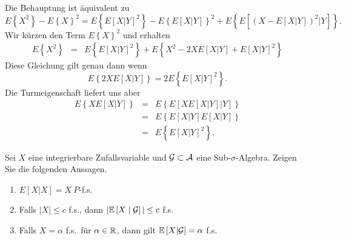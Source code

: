 \solution 
Die Behauptung ist äquivalent zu 
\begin{equation*}
    E\left\{ X^2 \right\} - E\left\{ X \right\}^2 
    = E\left\{ E\left[ X|Y \right]^2 \right\} - E\left\{ E\left[ X|Y \right] \right\}^2
    + E\left\{ E\left[ \left( X - E\left[ X|Y \right] \right)^2 |Y \right] \right\}.
\end{equation*}
Wir kürzen den Term $E\left\{ X \right\}^2$ und erhalten 
\begin{eqnarray*}
    E\left\{ X^2 \right\}&=& 
    E\left\{ E\left[ X|Y \right]^2 \right\} +
    E\left\{ X^2 - 2X E\left[ X|Y \right] + E\left[ X|Y \right]^2 \right\}
\end{eqnarray*}
Diese Gleichung gilt genau dann wenn
\begin{equation*}
    E\left\{  2X E\left[ X|Y \right] \right\} = 2 E\left\{ E\left[ X|Y \right]^2 \right\}.	
\end{equation*}
Die Turmeigenschaft liefert uns aber
\begin{eqnarray*}
    E\left\{  X E\left[ X|Y \right] \right\} &=& 
    E\left\{ E\left[ X E\left[ X|Y \right] | Y \right] \right\} \\
    &=& E\left\{ E\left[ X|Y \right] E\left[ X|Y \right]   \right\} \\
    &=& E\left\{ E\left[ X|Y \right]^2 \right\}.
\end{eqnarray*}


 Sei $X$ eine
integrierbare Zufallsvariable und $\mathcal G \subset \mathcal A$ eine Sub-$\sigma$-Algebra.
Zeigen Sie die folgenden Aussagen.
\begin{enumerate}
    \item $E\left[ X|X \right] = X \ P$-f.s.
    \item Falls $| X| \leq c$ f.s., dann $| \mathbb{E} \left[ X \;\middle\vert\; \mathcal G \right] | \leq c$ f.s.
    \item Falls $X=\alpha$ f.s.\ für $\alpha\in\mathbb{R}$, dann gilt 
        $\mathbb{E} \left[ X | \mathcal G  \right]= \alpha $ f.s.
\end{enumerate}


